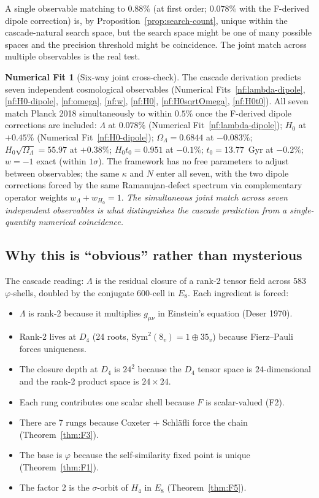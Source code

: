 \documentclass[11pt]{article}
\theoremstyle{plain}
\theoremstyle{definition}
\newtheorem{numfit}[theorem]{Numerical Fit}
\theoremstyle{remark}
\begin{document}
A single observable matching to $0.88\%$ (at first order; $0.078\%$ with the F-derived dipole correction) is, by Proposition~\ref{prop:search-count}, unique within the cascade-natural search space, but the search space might be one of many possible spaces and the precision threshold might be coincidence. The joint match across multiple observables is the real test.

\begin{numfit}[Six-way joint cross-check]\label{nf:joint}
The cascade derivation predicts seven independent cosmological observables (Numerical Fits~\ref{nf:lambda-dipole}, \ref{nf:H0-dipole}, \ref{nf:omega}, \ref{nf:w}, \ref{nf:H0}, \ref{nf:H0sqrtOmega}, \ref{nf:H0t0}). All seven match Planck 2018 simultaneously to within $0.5\%$ once the F-derived dipole corrections are included: $\Lambda$ at $0.078\%$ (Numerical Fit~\ref{nf:lambda-dipole}); $H_0$ at $+0.45\%$ (Numerical Fit~\ref{nf:H0-dipole}); $\Omega_\Lambda = 0.6844$ at $-0.083\%$; $H_0\sqrt{\Omega_\Lambda} = 55.97$ at $+0.38\%$; $H_0 t_0 = 0.951$ at $-0.1\%$; $t_0 = 13.77$~Gyr at $-0.2\%$; $w = -1$ exact (within $1\sigma$). The framework has no free parameters to adjust between observables; the same $\kappa$ and $N$ enter all seven, with the two dipole corrections forced by the same Ramanujan-defect spectrum via complementary operator weights $w_\Lambda + w_{H_0} = 1$. \emph{The simultaneous joint match across seven independent observables is what distinguishes the cascade prediction from a single-quantity numerical coincidence.}
\end{numfit}

\subsection{Why this is ``obvious'' rather than mysterious}

The cascade reading: $\Lambda$ is the residual closure of a rank-2 tensor field across 583 $\varphi$-shells, doubled by the conjugate 600-cell in $E_8$. Each ingredient is forced:
\begin{itemize}[leftmargin=2em]
\item $\Lambda$ is rank-2 because it multiplies $g_{\mu\nu}$ in Einstein's equation (Deser 1970).
\item Rank-2 lives at $D_4$ (24 roots, $\mathrm{Sym}^2(8_v) = 1 \oplus 35_v$) because Fierz--Pauli forces uniqueness.
\item The closure depth at $D_4$ is $24^2$ because the $D_4$ tensor space is $24$-dimensional and the rank-2 product space is $24 \times 24$.
\item Each rung contributes one scalar shell because $F$ is scalar-valued (F2).
\item There are 7 rungs because Coxeter + Schl\"afli force the chain (Theorem~\ref{thm:F3}).
\item The base is $\varphi$ because the self-similarity fixed point is unique (Theorem~\ref{thm:F1}).
\item The factor 2 is the $\sigma$-orbit of $H_4$ in $E_8$ (Theorem~\ref{thm:F5}).
\end{itemize}
\end{document}
